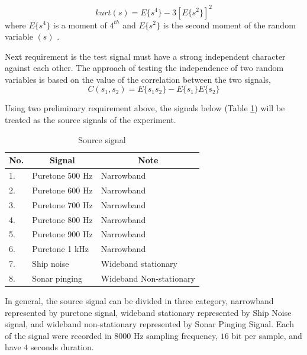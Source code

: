 \documentclass[a4paper]{jpconf}
\begin{document}
\begin{equation} \label{pers:kurt}
kurt(s) = E\{s^4\} - 3[E\{s^2\}]^2
\end{equation}
where $E\{s^4\}$ is a moment of $4^{th}$ and $E\{s^2\}$ is the second moment of the random variable $(s)$ \cite{3}.

Next requirement is the test signal must have a strong independent character against each other. The approach of testing the independence of two random variables is based on the value of the correlation between the two signals,
\begin{equation} \label{pers:corr}
C(s_1,s_2) = E\{s_1 s_2\} - E\{s_1\}E\{s_2\}
\end{equation}

Using two preliminary requirement above, the signals below (Table \ref{table:source}) will be treated as the source signals of the experiment.

\begin{table}[h]
\centering
\caption{Source signal}
\label{table:source}
\begin{tabular}{|l|l|l|}
\hline
\multicolumn{1}{|c|}{No.} & \multicolumn{1}{c|}{Signal} & \multicolumn{1}{c|}{Note} \\ \hline
1.                        & Puretone 500 Hz             & Narrowband                \\ \hline
2.                        & Puretone 600 Hz             & Narrowband                \\ \hline
3.                        & Puretone 700 Hz             & Narrowband                \\ \hline
4.                        & Puretone 800 Hz             & Narrowband                \\ \hline
5.                        & Puretone 900 Hz             & Narrowband                \\ \hline
6.                        & Puretone 1 kHz              & Narrowband                \\ \hline
7.                        & Ship noise                  & Wideband stationary       \\ \hline
8.                        & Sonar pinging               & Wideband Non-stationary   \\ \hline
\end{tabular}
\end{table}

In general, the source signal can be divided in three category, narrowband represented by puretone signal, wideband stationary represented by Ship Noise signal, and wideband non-stationary represented by Sonar Pinging Signal. Each of the signal were recorded in $8000$ Hz sampling frequency, $16$ bit per sample, and have $4$ seconds duration.
\end{document}
